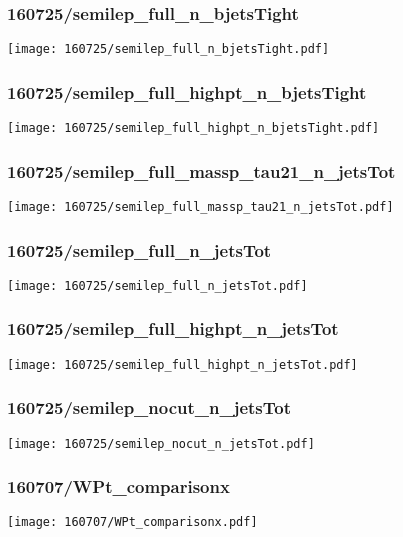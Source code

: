 \begin{frame}
   \frametitle{\small 160725/semilep\_full\_n\_bjetsTight}
   \centering
   \texttt{[image: 160725/semilep\_full\_n\_bjetsTight.pdf]}
\end{frame}

\begin{frame}
   \frametitle{\small 160725/semilep\_full\_highpt\_n\_bjetsTight}
   \centering
   \texttt{[image: 160725/semilep\_full\_highpt\_n\_bjetsTight.pdf]}
\end{frame}

\begin{frame}
   \frametitle{\small 160725/semilep\_full\_massp\_tau21\_n\_jetsTot}
   \centering
   \texttt{[image: 160725/semilep\_full\_massp\_tau21\_n\_jetsTot.pdf]}
\end{frame}

\begin{frame}
   \frametitle{\small 160725/semilep\_full\_n\_jetsTot}
   \centering
   \texttt{[image: 160725/semilep\_full\_n\_jetsTot.pdf]}
\end{frame}

\begin{frame}
   \frametitle{\small 160725/semilep\_full\_highpt\_n\_jetsTot}
   \centering
   \texttt{[image: 160725/semilep\_full\_highpt\_n\_jetsTot.pdf]}
\end{frame}

\begin{frame}
   \frametitle{\small 160725/semilep\_nocut\_n\_jetsTot}
   \centering
   \texttt{[image: 160725/semilep\_nocut\_n\_jetsTot.pdf]}
\end{frame}

\begin{frame}
   \frametitle{\small 160707/WPt\_comparisonx}
   \centering
   \texttt{[image: 160707/WPt\_comparisonx.pdf]}
\end{frame}

